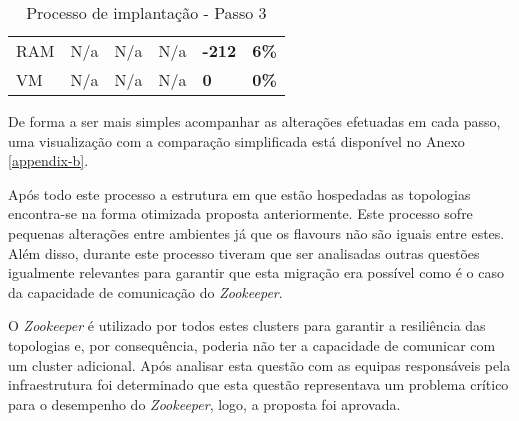 \begin{table}[H]
\begin{tabular}{|l|l|l|l|l|l|}
    \cellcolor[HTML]{C0C0C0}RAM                             & N/a                                                    & N/a                                                    & N/a    & \textbf{-212}    & \textbf{6\%} \\ \cline{1-6}
    \cellcolor[HTML]{C0C0C0}VM                              & N/a                                                    & N/a                                                    & N/a    & \textbf{0}    & \textbf{0\%} \\ \cline{1-6}
  \end{tabular}
  \caption{Processo de implantação - Passo 3}
  \label{tab:strat-3}
\end{table}

De forma a ser mais simples acompanhar as alterações efetuadas em cada passo, uma visualização
com a comparação simplificada está disponível no Anexo \ref{appendix-b}.

Após todo este processo a estrutura em que estão hospedadas as topologias encontra-se na forma
otimizada proposta anteriormente. Este processo sofre pequenas alterações entre ambientes já que 
os \glspl{flavour} não são iguais entre estes. Além disso, durante este processo tiveram que ser 
analisadas outras questões igualmente relevantes para garantir que esta migração era possível como 
é o caso da capacidade de comunicação do \textit{Zookeeper}.

O \textit{Zookeeper} é utilizado por todos estes \glspl{cluster} para garantir a resiliência das 
topologias e, por consequência, poderia não ter a capacidade de comunicar com um \gls{cluster}
adicional. Após analisar esta questão com as equipas responsáveis pela infraestrutura foi 
determinado que esta questão representava um problema crítico para o desempenho do 
\textit{Zookeeper}, logo, a proposta foi aprovada.

